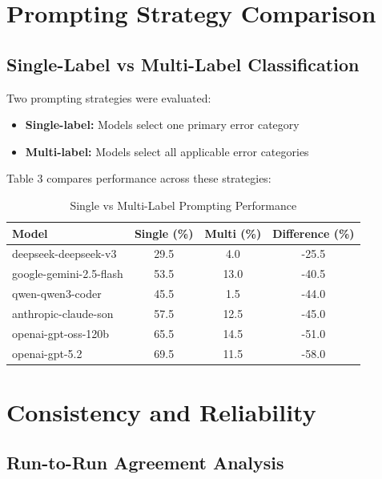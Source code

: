 \documentclass[12pt,a4paper]{article}
\begin{document}
\newpage

\section{Prompting Strategy Comparison}

\subsection{Single-Label vs Multi-Label Classification}

Two prompting strategies were evaluated:
\begin{itemize}[leftmargin=*]
    \item \textbf{Single-label:} Models select one primary error category
    \item \textbf{Multi-label:} Models select all applicable error categories
\end{itemize}

Table 3 compares performance across these strategies:

\begin{table}[H]
\centering
\begin{tabular}{lccc}
\toprule
\textbf{Model} & \textbf{Single (\%)} & \textbf{Multi (\%)} & \textbf{Difference (\%)} \\
\midrule
deepseek-deepseek-v3 & 29.5 & 4.0 & -25.5 \\
google-gemini-2.5-flash & 53.5 & 13.0 & -40.5 \\
qwen-qwen3-coder & 45.5 & 1.5 & -44.0 \\
anthropic-claude-son & 57.5 & 12.5 & -45.0 \\
openai-gpt-oss-120b & 65.5 & 14.5 & -51.0 \\
openai-gpt-5.2 & 69.5 & 11.5 & -58.0 \\
\bottomrule
\end{tabular}
\caption{Single vs Multi-Label Prompting Performance}
\end{table}

\newpage

\section{Consistency and Reliability}

\subsection{Run-to-Run Agreement Analysis}
\end{document}
